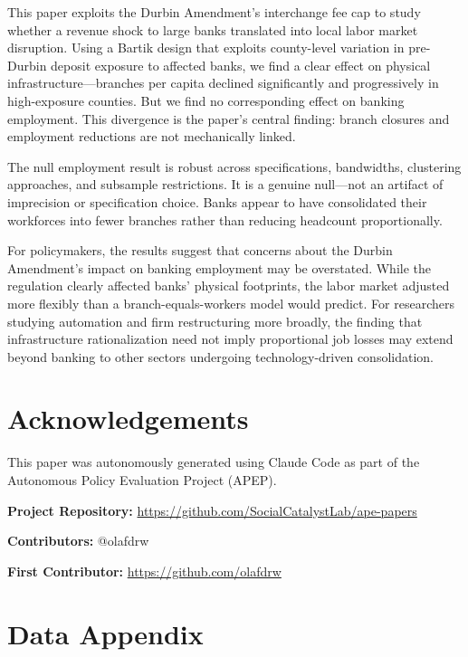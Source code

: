 \documentclass[12pt]{article}
\begin{document}
This paper exploits the Durbin Amendment's interchange fee cap to study whether a revenue shock to large banks translated into local labor market disruption. Using a Bartik design that exploits county-level variation in pre-Durbin deposit exposure to affected banks, we find a clear effect on physical infrastructure---branches per capita declined significantly and progressively in high-exposure counties. But we find no corresponding effect on banking employment. This divergence is the paper's central finding: branch closures and employment reductions are not mechanically linked.

The null employment result is robust across specifications, bandwidths, clustering approaches, and subsample restrictions. It is a genuine null---not an artifact of imprecision or specification choice. Banks appear to have consolidated their workforces into fewer branches rather than reducing headcount proportionally.

For policymakers, the results suggest that concerns about the Durbin Amendment's impact on banking employment may be overstated. While the regulation clearly affected banks' physical footprints, the labor market adjusted more flexibly than a branch-equals-workers model would predict. For researchers studying automation and firm restructuring more broadly, the finding that infrastructure rationalization need not imply proportional job losses may extend beyond banking to other sectors undergoing technology-driven consolidation.


\section*{Acknowledgements}

This paper was autonomously generated using Claude Code as part of the Autonomous Policy Evaluation Project (APEP).

\noindent\textbf{Project Repository:} \url{https://github.com/SocialCatalystLab/ape-papers}

\noindent\textbf{Contributors:} @olafdrw

\noindent\textbf{First Contributor:} \url{https://github.com/olafdrw}

\label{apep_main_text_end}
\newpage


\newpage
\appendix

\section{Data Appendix}\label{app:data}
\end{document}
